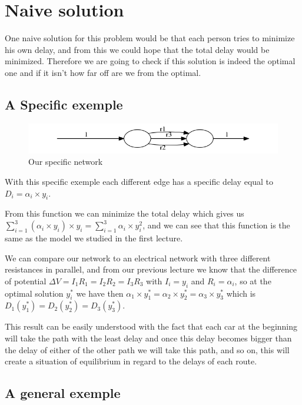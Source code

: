 \section{Naive solution}

One naive solution for this problem would be that each person tries to minimize his own delay, and from this we could hope that the total delay would be minimized. Therefore we are going to check if this solution is indeed the optimal one and if it isn't how far off are we from the optimal.

\subsection{A Specific exemple}

\begin{figure}[h]
\centering
\includegraphics[scale=0.5]{output.png}
\caption{Our specific network}
\end{figure}

With this specific exemple each different edge has a specific delay equal to $ D_i = \alpha_i \times y_i$.

From this function we can minimize the total delay which gives us $\sum\limits_{i=1}^{3} (\alpha_i \times y_i) \times y_i = \sum\limits_{i=1}^{3} \alpha_i \times y^2_i $, and we can see that this function is the same as the model we studied in the first lecture.

We can compare our network to an electrical network with three different resistances in parallel, and from our previous lecture we know that the difference of potential $ \Delta V = I_1 R_1 = I_2 R_2 = I_3 R_3 $ with $I_i = y_i $ and  $ R_i = \alpha_i $, so at the optimal solution $y^*_i$ we have then $\alpha_1 \times y^*_1 = \alpha_2 \times y^*_2 = \alpha_3 \times y^*_3$ which is  $ D_1(y^*_1) = D_2(y^*_2) = D_3(y^*_3)$.

This result can be easily understood with the fact that each car at the beginning will take the path with the least delay and once this delay becomes bigger than the delay of either of the other path we will take this path, and so on, this will create a situation of equilibrium in regard to the delays of each route.

\subsection{A general exemple}

